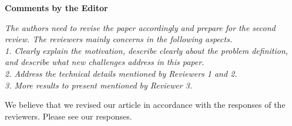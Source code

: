 \documentclass[10pt]{article}
\newcommand{\referee}[1]{
	{\item \color{OliveGreen} \emph{{#1}}}
	\label{R\therefereeCounter:\arabic{enumi}}
}
\newcommand{\response}[1]{{\color{blue} #1}}
\newenvironment{editor}{%
\textbf{\large Comments by the Editor}
\begin{enumerate}%
\renewcommand{\labelenumi}{\textbf{[E:\,\arabic{enumi}]}} %
}{\pagebreak\end{enumerate}}
\newcounter{refereeCounter}
\begin{document}
\begin{editor}
\referee{The authors need to revise the paper accordingly and prepare for the second review. The reviewers mainly concerns in the following aspects. \\
1. Clearly explain the motivation, describe clearly about the problem definition, and describe what new challenges address
in this paper. \\
2. Address the technical details mentioned by Reviewers 1 and 2. \\
3. More results to present mentioned by Reviewer 3.
}

\response{
	We believe that we revised our article in accordance with the responses of the reviewers. Please see our responses. 
}

\end{editor}
\end{document}
